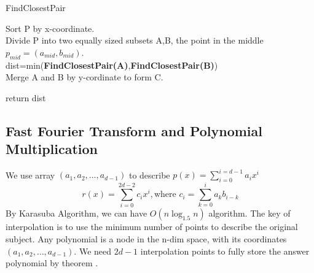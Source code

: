 \begin{algorithm}
    \caption{FindClosestPair}
    
    Sort P by x-coordinate.\\
    Divide P into two equally sized subsets A,B, the point in the middle $p_{mid}=(a_{mid},b_{mid})$.\\
    dist=min(\textbf{FindClosestPair(A)},\textbf{FindClosestPair(B)})\\
    Merge A and B by y-cordinate to form C.\\

    return dist
\end{algorithm}

\subsection{Fast Fourier Transform and Polynomial Multiplication}
We use array $(a_1,a_2,\ldots,a_{d-1})$ to describe $p(x)=\sum_{i=0}^{i=d-1} a_ix^i$
\[
    r(x)=\sum_{i=0}^{2d-2}c_ix^i, \text{where } c_i=\sum_{k=0}^{i}a_kb_{i-k}\]
By Karasuba Algorithm, we can have $O(n \log_{1.5} n)$ algorithm.
The key of interpolation is to use the minimum number of points to describe the original subject.
Any polynomial is a node in the n-dim space, with its coordinates $(a_1,a_2,\ldots,a_{d-1})$.
We need $2d-1$ interpolation points to fully store the answer polynomial by theorem .

